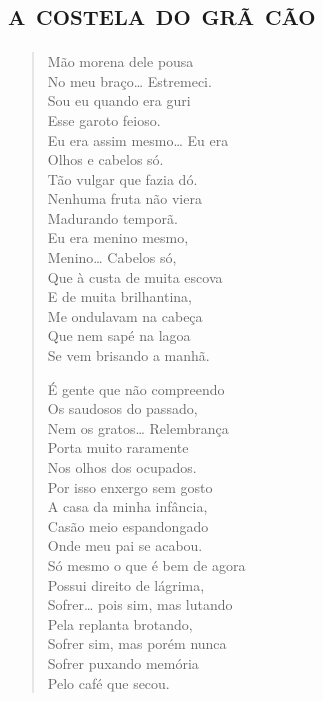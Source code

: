 {\movetooddpage
{}
\part{\textsc{a costela do grã cão}}
\removeepigraph


\begin{verse}
Mão morena dele pousa\\
No meu braço\ldots{} Estremeci.\\
Sou eu quando era guri\\
Esse garoto feioso.\\
Eu era assim mesmo\ldots{} Eu era\\
Olhos e cabelos só.\\
Tão vulgar que fazia dó.\\
Nenhuma fruta não viera\\
Madurando temporã.\\
Eu era menino mesmo,\\
Menino\ldots{} Cabelos só,\\
Que à custa de muita escova\\
E de muita brilhantina,\\
Me ondulavam na cabeça\\
Que nem sapé na lagoa\\
Se vem brisando a manhã.

É gente que não compreendo\\
Os saudosos do passado,\\
Nem os gratos\ldots{} Relembrança\\
Porta muito raramente\\
Nos olhos dos ocupados.\\
Por isso enxergo sem gosto\\
A casa da minha infância,\\
Casão meio espandongado\\
Onde meu pai se acabou.\\
Só mesmo o que é bem de agora\\
Possui direito de lágrima,\\
Sofrer\ldots{} pois sim, mas lutando\\
Pela replanta brotando,\\
Sofrer sim, mas porém nunca\\
Sofrer puxando memória\\
Pelo café que secou.


\end{verse}}
